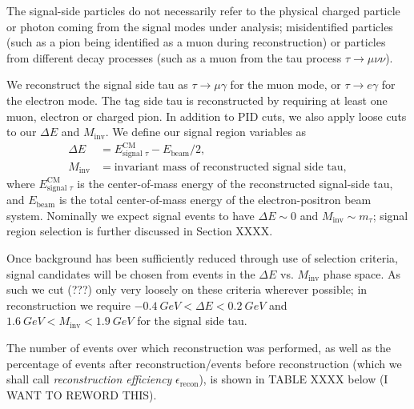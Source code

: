 \documentclass[12pt]{thesis}  %
\begin{document}
The signal-side particles do not necessarily refer to the physical charged particle or photon coming from the signal modes under analysis; misidentified particles (such as a pion being identified as a muon during reconstruction) or particles from different decay processes (such as a muon from the tau process $\tau\to\mu\nu\nu$).


We reconstruct the signal side tau as $\tau \to \mu \gamma$ for the muon mode, or $\tau \to e \gamma$ for the electron mode. The tag side tau is reconstructed by requiring at least one muon, electron or charged pion. In addition to PID cuts, we also apply loose cuts to our $\Delta E$ and $M_{\text{inv}}$. We define our signal region variables as
\begin{align}
\Delta E &= E^{\text{CM}}_{\text{signal }\tau} - E_{\text{beam}}/2,\\
M_{\text{inv}} &= \text{invariant mass of reconstructed signal side tau},
\end{align}
where $E^{\text{CM}}_{\text{signal }\tau}$ is the center-of-mass energy of the reconstructed signal-side tau, and $E_{\text{beam}}$ is the total center-of-mass energy of the electron-positron beam system. Nominally we expect signal events to have $\Delta E\sim 0$ and $M_{\text{inv}}\sim m_{\tau}$; signal region selection is further discussed in Section XXXX.

Once background has been sufficiently reduced through use of selection criteria, signal candidates will be chosen from events in the $\Delta E$ vs. $M_{\text{inv}}$ phase space. As such we cut (???) only very loosely on these criteria wherever possible; in reconstruction we require $\SI{-0.4}{GeV} < \Delta E < \SI{0.2}{GeV}$ and $\SI{1.6}{GeV} < M_{\text{inv}} < \SI{1.9}{GeV}$ for the signal side tau. 

The number of events over which reconstruction was performed, as well as the percentage of events after reconstruction/events before reconstruction (which we shall call \emph{reconstruction efficiency} $\epsilon_{\text{recon}}$), is shown in TABLE XXXX below (I WANT TO REWORD THIS).
\end{document}

